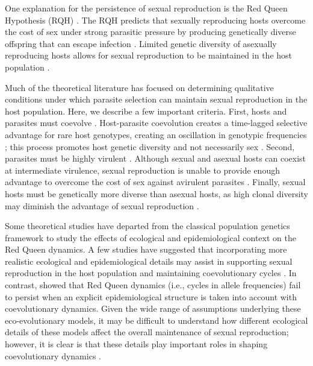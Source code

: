 \documentclass{article}\usepackage[]{graphicx}\usepackage[]{color}
\begin{document}
One explanation for the persistence of sexual reproduction is the Red Queen Hypothesis (RQH) \citep{bell1982masterpiece}.
The RQH predicts that sexually reproducing hosts overcome the cost of sex under strong parasitic pressure by producing genetically diverse offspring that can escape infection \citep{jbs1949disease, jaenike1978hypothesis, hamilton1980sex, hamilton1990sexual}.
Limited genetic diversity of asexually reproducing hosts allows for sexual reproduction to be maintained in the host population \citep{ashby2015diversity}.

Much of the theoretical literature has focused on determining qualitative conditions under which parasite selection can maintain sexual reproduction in the host population.
Here, we describe a few important criteria.
First, hosts and parasites must coevolve \citep{bell1982masterpiece}.
Host-parasite coevolution creates a time-lagged selective advantage for rare host genotypes, creating an oscillation in genotypic frequencies \citep{clarke1976ecological,jaenike1978hypothesis, hamilton1980sex, agrawal2001parasites}; this process promotes host genetic diversity and not necessarily sex \citep{king2009geographic, dagan2013clonal, ashby2015diversity}.
Second, parasites must be highly virulent \citep{may1983epidemiology}.
Although sexual and asexual hosts can coexist at intermediate virulence, sexual reproduction is unable to provide enough advantage to overcome the cost of sex against avirulent parasites \citep{howard1994parasitism}.
Finally, sexual hosts must be genetically more diverse than asexual hosts, as high clonal diversity may diminish the advantage of sexual reproduction \citep{lively1994selection, lively2010review, ashby2015diversity}.

Some theoretical studies have departed from the classical population genetics framework to study the effects of ecological and epidemiological context on the Red Queen dynamics.
A few studies have suggested that incorporating more realistic ecological and epidemiological details may assist in supporting sexual reproduction in the host population \citep{lively2009maintenance, lively2010epidemiological} and maintaining coevolutionary cycles \citep{ashby2014parasitic}.
In contrast, \cite{macpherson2018joint} showed that Red Queen dynamics (i.e., cycles in allele frequencies) fail to persist when an explicit epidemiological structure is taken into account with coevolutionary dynamics.
Given the wide range of assumptions underlying these eco-evolutionary models, it may be difficult to understand how different ecological details of these models affect the overall maintenance of sexual reproduction;
however, it is clear is that these details play important roles in shaping coevolutionary dynamics \citep{song2015host, haafke2016eco, ashby2019understanding}.
\end{document}

